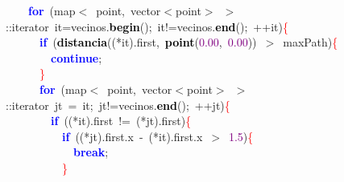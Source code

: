 \mbox{}\ \ \ \ \textbf{\textcolor{Blue}{for}}\ \textcolor{BrickRed}{(}map\textcolor{BrickRed}{$<$}\ point\textcolor{BrickRed}{,}\ vector\textcolor{BrickRed}{$<$}point\textcolor{BrickRed}{$>$}\ \textcolor{BrickRed}{$>$::}iterator\ it\textcolor{BrickRed}{=}vecinos\textcolor{BrickRed}{.}\textbf{\textcolor{Black}{begin}}\textcolor{BrickRed}{();}\ it\textcolor{BrickRed}{!=}vecinos\textcolor{BrickRed}{.}\textbf{\textcolor{Black}{end}}\textcolor{BrickRed}{();}\ \textcolor{BrickRed}{++}it\textcolor{BrickRed}{)}\textcolor{Red}{\{} \\
\mbox{}\ \ \ \ \ \ \textbf{\textcolor{Blue}{if}}\ \textcolor{BrickRed}{(}\textbf{\textcolor{Black}{distancia}}\textcolor{BrickRed}{((*}it\textcolor{BrickRed}{).}first\textcolor{BrickRed}{,}\ \textbf{\textcolor{Black}{point}}\textcolor{BrickRed}{(}\textcolor{Purple}{0.00}\textcolor{BrickRed}{,}\ \textcolor{Purple}{0.00}\textcolor{BrickRed}{))}\ \textcolor{BrickRed}{$>$}\ maxPath\textcolor{BrickRed}{)}\textcolor{Red}{\{} \\
\mbox{}\ \ \ \ \ \ \ \ \textbf{\textcolor{Blue}{continue}}\textcolor{BrickRed}{;} \\
\mbox{}\ \ \ \ \ \ \textcolor{Red}{\}} \\
\mbox{}\ \ \ \ \ \ \textbf{\textcolor{Blue}{for}}\ \textcolor{BrickRed}{(}map\textcolor{BrickRed}{$<$}\ point\textcolor{BrickRed}{,}\ vector\textcolor{BrickRed}{$<$}point\textcolor{BrickRed}{$>$}\ \textcolor{BrickRed}{$>$::}iterator\ jt\ \textcolor{BrickRed}{=}\ it\textcolor{BrickRed}{;}\ jt\textcolor{BrickRed}{!=}vecinos\textcolor{BrickRed}{.}\textbf{\textcolor{Black}{end}}\textcolor{BrickRed}{();}\ \textcolor{BrickRed}{++}jt\textcolor{BrickRed}{)}\textcolor{Red}{\{} \\
\mbox{}\ \ \ \ \ \ \ \ \textbf{\textcolor{Blue}{if}}\ \textcolor{BrickRed}{((*}it\textcolor{BrickRed}{).}first\ \textcolor{BrickRed}{!=}\ \textcolor{BrickRed}{(*}jt\textcolor{BrickRed}{).}first\textcolor{BrickRed}{)}\textcolor{Red}{\{} \\
\mbox{}\ \ \ \ \ \ \ \ \ \ \textbf{\textcolor{Blue}{if}}\ \textcolor{BrickRed}{((*}jt\textcolor{BrickRed}{).}first\textcolor{BrickRed}{.}x\ \textcolor{BrickRed}{-}\ \textcolor{BrickRed}{(*}it\textcolor{BrickRed}{).}first\textcolor{BrickRed}{.}x\ \textcolor{BrickRed}{$>$}\ \textcolor{Purple}{1.5}\textcolor{BrickRed}{)}\textcolor{Red}{\{} \\
\mbox{}\ \ \ \ \ \ \ \ \ \ \ \ \textbf{\textcolor{Blue}{break}}\textcolor{BrickRed}{;} \\
\mbox{}\ \ \ \ \ \ \ \ \ \ \textcolor{Red}{\}} \\
